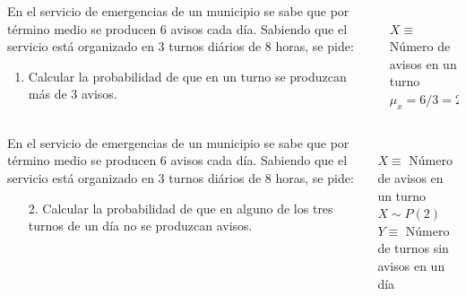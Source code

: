 \documentclass[aspectratio=149,10pt,t]{beamer}
\begin{document}
\begin{frame}
	\begin{columns}
		\begin{column}[T]{0.7\textwidth}
			En el servicio de emergencias de un municipio se sabe que por término medio se producen 6 avisos cada día.
			Sabiendo que el servicio está organizado en 3 turnos diários de 8 horas, se pide:
			\begin{enumerate}
			  \item Calcular la probabilidad de que en un turno se produzcan más de 3 avisos.
			\end{enumerate}
		\end{column}
		\begin{column}[T]{0.3\textwidth}
			\\
			$X\equiv$ Número de avisos en un turno\\
			$\mu_x=6/3=2$
		\end{column}
	\end{columns}
\end{frame}


\begin{frame}
	\begin{columns}
		\begin{column}[T]{0.7\textwidth}
			En el servicio de emergencias de un municipio se sabe que por término medio se producen 6 avisos cada día.
			Sabiendo que el servicio está organizado en 3 turnos diários de 8 horas, se pide:
			\begin{enumerate}
			  \item[2.] Calcular la probabilidad de que en alguno de los tres turnos de un día no se produzcan avisos.
			\end{enumerate}
		\end{column}
		\begin{column}[T]{0.3\textwidth}
			\structure{Datos}\\
			$X\equiv$ Número de avisos en un turno\\
			$X\sim P(2)$\\
			$Y\equiv$ Número de turnos sin avisos en un día
		\end{column}
	\end{columns}
\end{frame}
\end{document}
